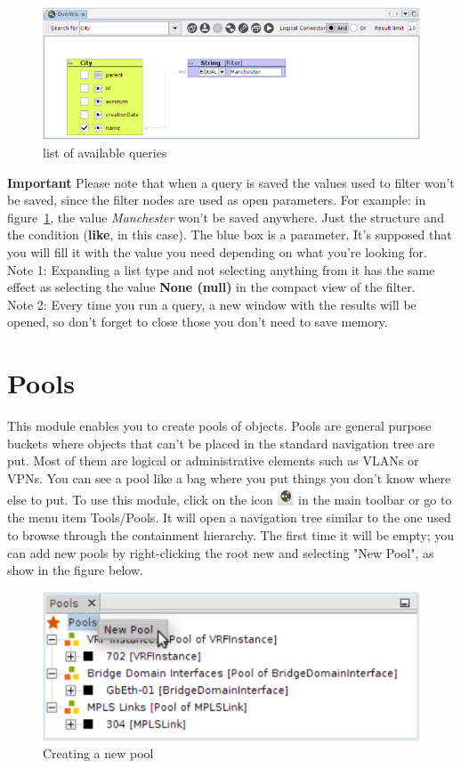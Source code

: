 \documentclass[a4paper]{article}
\begin{document}
	\begin{figure}[h!]
		\centering
		\includegraphics[width=0.7\linewidth]{img/query_filter_value_not_saved.png}
		\caption{list of available queries}
		\label{fig:query_filter_value_not_saved}
	\end{figure}
	
	\begin{framed} {\large \textbf{Important}}
		Please note that when a query is saved the values used to filter won't be saved, since the filter nodes are used as open parameters. For example: in figure~\ref{fig:query_filter_value_not_saved}, the value \textit{Manchester} won't be saved anywhere. Just the structure and the condition (\textbf{like}, in this case). The blue box is a parameter. It's supposed that you will fill it with the value you need depending on what you're looking for.
		\\Note 1: Expanding a list type and not selecting anything from it has the same effect as selecting the value \textbf{None (null)} in the compact view of the filter.
		\\Note 2: Every time you run a query, a new window with the results will be opened, so don't forget to close those you don't need to save memory.
	\end{framed}
	
	\clearpage
	\section{Pools} \label{sec:pools_manager}
	This module enables you to create pools of objects. Pools are general purpose buckets where objects that can't be placed in the standard navigation tree are put. Most of them are logical or administrative elements such as VLANs or VPNs. You can see a pool like a bag where you put things you don't know where else to put. To use this module, click on the icon  \includegraphics[width=0.5cm]{img/icon_pools_manager.png} in the main toolbar or go to the menu item Tools/Pools. It will open a navigation tree similar to the one used to browse through the containment hierarchy. The first time it will be empty; you can add new pools by right-clicking the root new and selecting "New Pool", as show in the figure below.
	\begin{figure}[h!]
		\centering
		\includegraphics[width=0.5\linewidth]{img/pools_actions.png}
		\caption{Creating a new pool}
		\label{fig:pools_actions}
	\end{figure}
	
\end{document}
